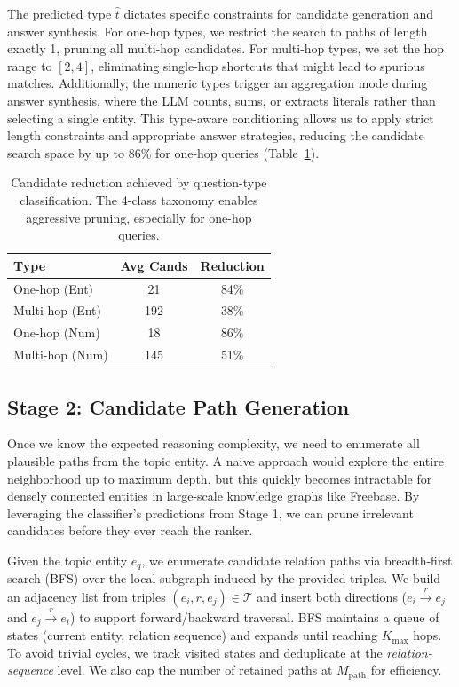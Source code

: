 \documentclass[conference]{IEEEtran}
\begin{document}
The predicted type $\hat{t}$ dictates specific constraints for candidate generation and answer synthesis. For one-hop types, we restrict the search to paths of length exactly 1, pruning all multi-hop candidates. For multi-hop types, we set the hop range to $[2,4]$, eliminating single-hop shortcuts that might lead to spurious matches. Additionally, the numeric types trigger an aggregation mode during answer synthesis, where the LLM counts, sums, or extracts literals rather than selecting a single entity. This type-aware conditioning allows us to apply strict length constraints and appropriate answer strategies, reducing the candidate search space by up to 86\% for one-hop queries (Table~\ref{tab:classifier}).

\begin{table}[t]
\centering
\caption{Candidate reduction achieved by question-type classification. The 4-class taxonomy enables aggressive pruning, especially for one-hop queries.}
\label{tab:classifier}
\begin{tabular}{lcc}
\toprule
Type & Avg Cands & Reduction \\
\midrule
One-hop (Ent) & 21 & 84\% \\
Multi-hop (Ent) & 192 & 38\% \\
One-hop (Num) & 18 & 86\% \\
Multi-hop (Num) & 145 & 51\% \\
\bottomrule
\end{tabular}
\end{table}

\subsection{Stage 2: Candidate Path Generation}

Once we know the expected reasoning complexity, we need to enumerate all plausible paths from the topic entity. A naive approach would explore the entire neighborhood up to maximum depth, but this quickly becomes intractable for densely connected entities in large-scale knowledge graphs like Freebase. By leveraging the classifier's predictions from Stage 1, we can prune irrelevant candidates before they ever reach the ranker.

Given the topic entity $e_q$, we enumerate candidate relation paths via breadth-first search (BFS) over the local subgraph induced by the provided triples. We build an adjacency list from triples $(e_i,r,e_j)\in\mathcal{T}$ and insert both directions ($e_i\xrightarrow{r}e_j$ and $e_j\xrightarrow{r}e_i$) to support forward/backward traversal. BFS maintains a queue of states (current entity, relation sequence) and expands until reaching $K_{\text{max}}$ hops. To avoid trivial cycles, we track visited states and deduplicate at the \emph{relation-sequence} level. We also cap the number of retained paths at $M_{\text{path}}$ for efficiency.
\end{document}
